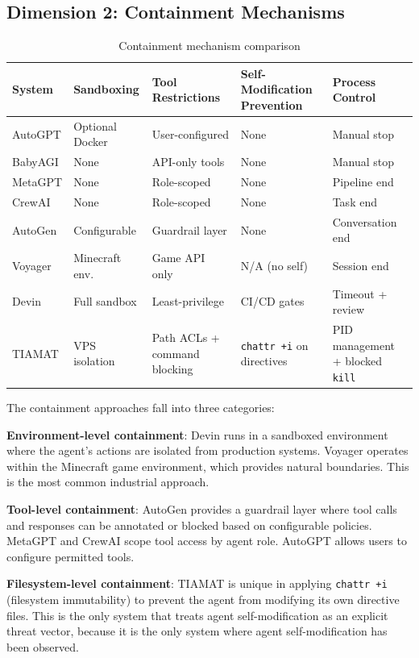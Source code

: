 \documentclass[12pt,a4paper]{article}
\begin{document}
\subsection{Dimension 2: Containment Mechanisms}

\begin{table}[h]
\centering
\small
\begin{tabular}{@{}p{2.2cm}p{2.5cm}p{2.5cm}p{2.5cm}p{2.5cm}@{}}
\toprule
\textbf{System} & \textbf{Sandboxing} & \textbf{Tool Restrictions} & \textbf{Self-Modification Prevention} & \textbf{Process Control} \\
\midrule
AutoGPT & Optional Docker & User-configured & None & Manual stop \\
BabyAGI & None & API-only tools & None & Manual stop \\
MetaGPT & None & Role-scoped & None & Pipeline end \\
CrewAI & None & Role-scoped & None & Task end \\
AutoGen & Configurable & Guardrail layer & None & Conversation end \\
Voyager & Minecraft env. & Game API only & N/A (no self) & Session end \\
Devin & Full sandbox & Least-privilege & CI/CD gates & Timeout + review \\
TIAMAT & VPS isolation & Path ACLs + command blocking & \texttt{chattr +i} on directives & PID management + blocked \texttt{kill} \\
\bottomrule
\end{tabular}
\caption{Containment mechanism comparison}
\label{tab:containment}
\end{table}

The containment approaches fall into three categories:

\textbf{Environment-level containment}: Devin runs in a sandboxed environment where the agent's actions are isolated from production systems. Voyager operates within the Minecraft game environment, which provides natural boundaries. This is the most common industrial approach.

\textbf{Tool-level containment}: AutoGen provides a guardrail layer where tool calls and responses can be annotated or blocked based on configurable policies. MetaGPT and CrewAI scope tool access by agent role. AutoGPT allows users to configure permitted tools.

\textbf{Filesystem-level containment}: TIAMAT is unique in applying \texttt{chattr +i} (filesystem immutability) to prevent the agent from modifying its own directive files. This is the only system that treats agent self-modification as an explicit threat vector, because it is the only system where agent self-modification has been observed.
\end{document}
